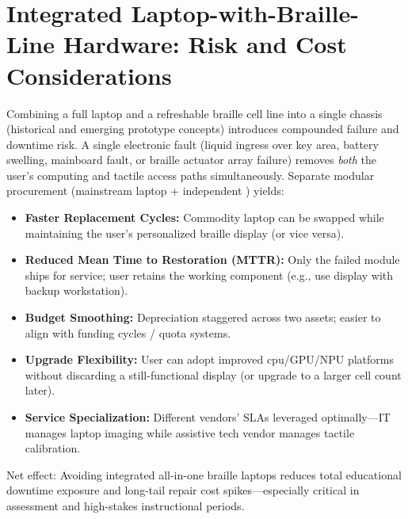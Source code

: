 \section*{Integrated Laptop-with-Braille-Line Hardware: Risk and Cost Considerations}
Combining a full laptop and a refreshable braille cell line into a single chassis (historical and emerging prototype concepts) introduces compounded failure and downtime risk. A single electronic fault (liquid ingress over key area, battery swelling, mainboard fault, or braille actuator array failure) removes \emph{both} the user's computing and tactile access paths simultaneously. Separate modular procurement (mainstream laptop + independent ) yields:
\begin{itemize}
	\item \textbf{Faster Replacement Cycles:} Commodity laptop can be swapped while maintaining the user's personalized braille display (or vice versa).
	\item \textbf{Reduced Mean Time to Restoration (MTTR):} Only the failed module ships for service; user retains the working component (e.g., use display with backup workstation).
	\item \textbf{Budget Smoothing:} Depreciation staggered across two assets; easier to align with funding cycles / quota systems.
	\item \textbf{Upgrade Flexibility:} User can adopt improved \gls{cpu}/GPU/NPU platforms without discarding a still-functional display (or upgrade to a larger cell count later).
	\item \textbf{Service Specialization:} Different vendors’ SLAs leveraged optimally—IT manages laptop imaging while assistive tech vendor manages tactile  calibration.
\end{itemize}
Net effect: Avoiding integrated all-in-one braille laptops reduces total educational downtime exposure and long-tail repair cost spikes—especially critical in assessment and high-stakes instructional periods.

